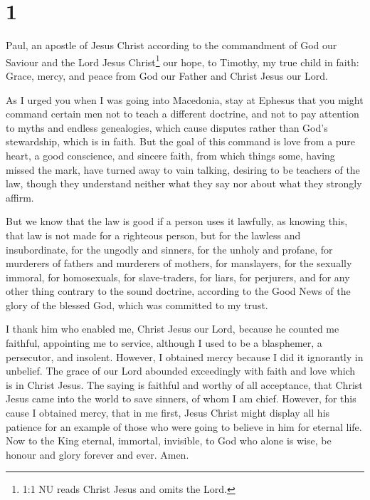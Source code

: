 \hypertarget{section}{%
\section{1}\label{section}}

 Paul, an apostle of Jesus Christ according to the
commandment of God our Saviour and the Lord Jesus Christ\footnote{1:1 NU
  reads Christ Jesus and omits the Lord.} our hope,  to
Timothy, my true child in faith: Grace, mercy, and peace from God our
Father and Christ Jesus our Lord.

 As I urged you when I was going into Macedonia, stay at
Ephesus that you might command certain men not to teach a different
doctrine,  and not to pay attention to myths and endless
genealogies, which cause disputes rather than God's stewardship, which
is in faith.  But the goal of this command is love from a
pure heart, a good conscience, and sincere faith,  from
which things some, having missed the mark, have turned away to vain
talking,  desiring to be teachers of the law, though they
understand neither what they say nor about what they strongly affirm.

 But we know that the law is good if a person uses it
lawfully,  as knowing this, that law is not made for a
righteous person, but for the lawless and insubordinate, for the ungodly
and sinners, for the unholy and profane, for murderers of fathers and
murderers of mothers, for manslayers,  for the sexually
immoral, for homosexuals, for slave-traders, for liars, for perjurers,
and for any other thing contrary to the sound doctrine, 
according to the Good News of the glory of the blessed God, which was
committed to my trust.

 I thank him who enabled me, Christ Jesus our Lord, because
he counted me faithful, appointing me to service,  although
I used to be a blasphemer, a persecutor, and insolent. However, I
obtained mercy because I did it ignorantly in unbelief. 
The grace of our Lord abounded exceedingly with faith and love which is
in Christ Jesus.  The saying is faithful and worthy of all
acceptance, that Christ Jesus came into the world to save sinners, of
whom I am chief.  However, for this cause I obtained mercy,
that in me first, Jesus Christ might display all his patience for an
example of those who were going to believe in him for eternal life.
 Now to the King eternal, immortal, invisible, to God who
alone is wise, be honour and glory forever and ever. Amen.

